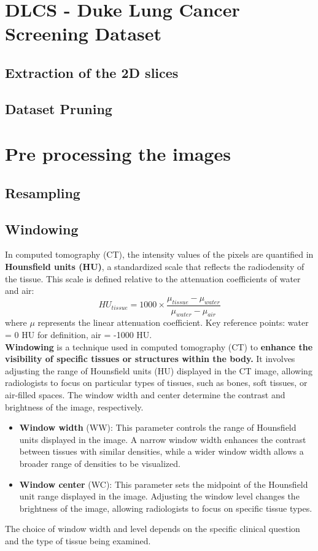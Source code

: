 \section{DLCS - Duke Lung Cancer Screening Dataset}
\subsection{Extraction of the 2D slices}
\subsection{Dataset Pruning}

\section{Pre processing the images}
\subsection{Resampling}
\subsection{Windowing}
In computed tomography (CT), the intensity values of the pixels are quantified in \textbf{Hounsfield units (HU)}, a standardized scale that reflects the radiodensity of the tissue. This scale is defined relative to the attenuation coefficients of water and air:
\begin{equation}
    HU_{tissue} = 1000 \times \dfrac{\mu_{tissue} - \mu_{water}}{\mu_{water}-\mu_{air}}
\end{equation}
where $\mu$ represents the linear attenuation coefficient. Key reference points: water = 0 HU for definition, air = -1000 HU. \\
\textbf{Windowing} is a technique used in computed tomography (CT) to \textbf{enhance the visibility of specific tissues or structures within the body.} It involves adjusting the range of Hounsfield units (HU) displayed in the CT image, allowing radiologists to focus on particular types of tissues, such as bones, soft tissues, or air-filled spaces. The window width and center determine the contrast and brightness of the image, respectively.
\begin{itemize}
    \item \textbf{Window width} (WW): This parameter controls the range of Hounsfield units displayed in the image. A narrow window width enhances the contrast between tissues with similar densities, while a wider window width allows a broader range of densities to be visualized.
    \item \textbf{Window center} (WC): This parameter sets the midpoint of the Hounsfield unit range displayed in the image. Adjusting the window level changes the brightness of the image, allowing radiologists to focus on specific tissue types.
\end{itemize}
The choice of window width and level depends on the specific clinical question and the type of tissue being examined. 


